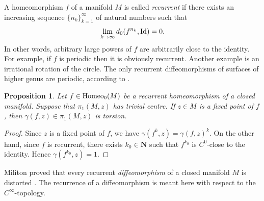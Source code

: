 \documentclass[11pt]{amsart}
\newtheorem{proposition}[subsection]{Proposition}
\theoremstyle{definition}
\theoremstyle{remark}
\numberwithin{equation}{section}
\numberwithin{figure}{section}
\newcommand{\B}[1]{{\mathbf #1}}
\begin{document}
A homeomorphism $f$ of a manifold $M$ is called {\it recurrent}
if there exists an increasing sequence $\{n_k\}_{k=1}^\infty$ of natural numbers
such that 
$$\lim_{k\to \infty} d_0(f^{n_k},{\rm Id}) = 0.$$
In other words, arbitrary large powers of $f$ are arbitrarily close to the
identity. For example, if $f$ is periodic then it is obviously recurrent.
Another example is an irrational rotation of the circle.  The only recurrent
diffeomorphisms of surfaces of higher genus are periodic, according to \cite{zbMATH01202977}.

\begin{proposition}\label{P:recurrent}
Let $f\in {\rm Homeo}_0(M)$ be a recurrent homeomorphism of
a closed manifold. Suppose that $\pi_1(M,z)$ has trivial centre.
If $z \in M$ is a fixed point of $f$, then
$\gamma(f,z)\in \pi_1(M,z)$ is torsion.
\end{proposition}

\begin{proof}
Since $z$ is a fixed point of $f$, we have $\gamma(f^k,z)=\gamma(f,z)^k$.
On the other hand, since $f$ is recurrent, there exists 
$k_0\in \B N$ such that $f^{k_0}$ is $C^{0}$-close to
the identity. Hence $\gamma(f^{k_0},z)=1$. 
\end{proof}

Militon proved that every recurrent {\it diffeomorphism} of a closed
manifold $M$ is distorted \cite{zbMATH06161942}. The recurrence of a
diffeomorphism is meant here with respect to the $C^{\infty}$-topology.

%


\end{document}
